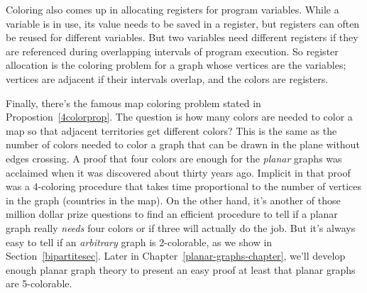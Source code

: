 Coloring also comes up in allocating registers for program variables.
While a variable is in use, its value needs to be saved in a register, but
registers can often be reused for different variables.  But two variables
need different registers if they are referenced during overlapping
intervals of program execution.  So register allocation is the coloring
problem for a graph whose vertices are the variables; vertices are
adjacent if their intervals overlap, and the colors are registers.

Finally, there's the famous map coloring problem stated in
Propostion~\ref{4colorprop}.  The question is how many colors are needed
to color a map so that adjacent territories get different colors?  This is
the same as the number of colors needed to color a graph that can be drawn
in the plane without edges crossing.  A proof that four colors are enough
for the \emph{planar} graphs was acclaimed when it was discovered about
thirty years ago.  Implicit in that proof was a 4-coloring procedure that
takes time proportional to the number of vertices in the graph (countries
in the map).  On the other hand, it's another of those million dollar
prize questions to find an efficient procedure to tell if a planar graph
really \emph{needs} four colors or if three will actually do the job.  But
it's always easy to tell if an \emph{arbitrary} graph is 2-colorable, as
we show in Section~\ref{bipartitesec}.  Later in
Chapter~\ref{planar-graphs-chapter}, we'll develop enough planar graph
theory to present an easy proof at least that planar graphs are
5-colorable.

\begin{problems}
\classproblems
{}


\homeworkproblems
{}

\examproblems
{}

\end{problems}

\label{bipartitesec}

